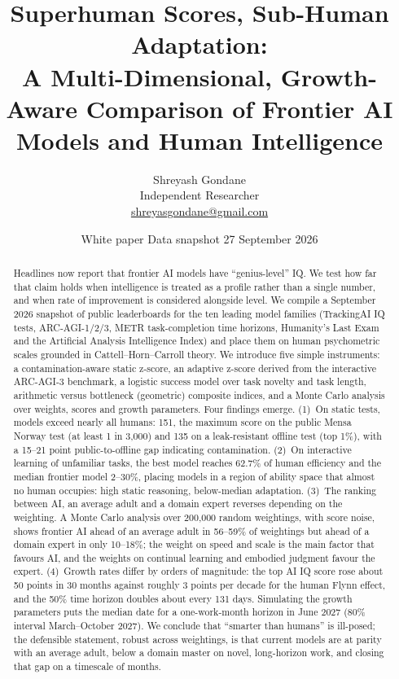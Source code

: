 \documentclass[11pt]{article}
\title{\vspace{-1.5em}\textbf{Superhuman Scores, Sub-Human Adaptation:}\\[2pt]
\large A Multi-Dimensional, Growth-Aware Comparison of Frontier AI Models and Human Intelligence}
\author{Shreyash Gondane\\ \small Independent Researcher \\ \small\href{mailto:shreyasgondane@gmail.com}{shreyasgondane@gmail.com}}
\date{\small White paper \textperiodcentered{} Data snapshot 27 September 2026}
\begin{document}
\maketitle
\thispagestyle{fancy}

\begin{abstract}
\noindent Headlines now report that frontier AI models have ``genius-level'' IQ. We test how far that claim holds when intelligence is treated as a profile rather than a single number, and when rate of improvement is considered alongside level. We compile a September 2026 snapshot of public leaderboards for the ten leading model families (TrackingAI IQ tests, ARC-AGI-1/2/3, METR task-completion time horizons, Humanity's Last Exam and the Artificial Analysis Intelligence Index) and place them on human psychometric scales grounded in Cattell--Horn--Carroll theory. We introduce five simple instruments: a contamination-aware static z-score, an adaptive z-score derived from the interactive ARC-AGI-3 benchmark, a logistic success model over task novelty and task length, arithmetic versus bottleneck (geometric) composite indices, and a Monte Carlo analysis over weights, scores and growth parameters. Four findings emerge. (1)~On static tests, models exceed nearly all humans: 151, the maximum score on the public Mensa Norway test (at least 1 in 3,000) and 135 on a leak-resistant offline test (top 1\%), with a 15--21 point public-to-offline gap indicating contamination. (2)~On interactive learning of unfamiliar tasks, the best model reaches 62.7\% of human efficiency and the median frontier model 2--30\%, placing models in a region of ability space that almost no human occupies: high static reasoning, below-median adaptation. (3)~The ranking between AI, an average adult and a domain expert reverses depending on the weighting. A Monte Carlo analysis over 200,000 random weightings, with score noise, shows frontier AI ahead of an average adult in 56--59\% of weightings but ahead of a domain expert in only 10--18\%; the weight on speed and scale is the main factor that favours AI, and the weights on continual learning and embodied judgment favour the expert. (4)~Growth rates differ by orders of magnitude: the top AI IQ score rose about 50 points in 30 months against roughly 3 points per decade for the human Flynn effect, and the 50\% time horizon doubles about every 131 days. Simulating the growth parameters puts the median date for a one-work-month horizon in June 2027 (80\% interval March--October 2027). We conclude that ``smarter than humans'' is ill-posed; the defensible statement, robust across weightings, is that current models are at parity with an average adult, below a domain master on novel, long-horizon work, and closing that gap on a timescale of months.
\end{abstract}
\end{document}
